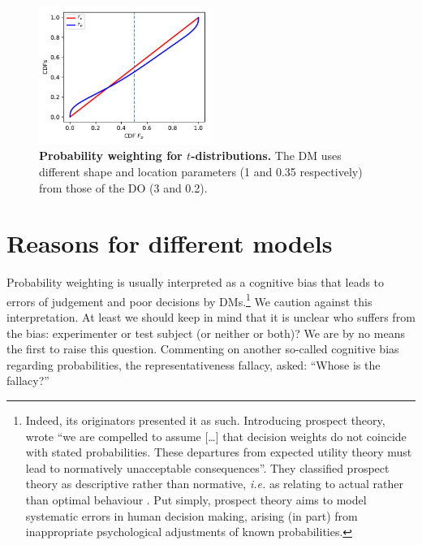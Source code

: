 \documentclass[a4paper, 12pt]{article}
\newcommand{\flabel}[1]{\label{fig:#1}}
\newcommand{\seclabel}[1]{\label{sec:#1}}
\newcommand{\ie}{\textit{i.e.}\xspace}
\newcommand{\ND}{\mathcal{N}} %
\begin{document}
\begin{figure}[htb]
\centering
\includegraphics[width=0.5\textwidth]{./figs/Student-t.pdf}
\caption{\textbf{Probability weighting for $t$-distributions.} The DM uses different shape and location parameters (1 and 0.35 respectively) from those of the DO (3 and 0.2).}
\flabel{Student-t}
\end{figure}



\FloatBarrier

\section{Reasons for different models\seclabel{Reasons_for}}
Probability weighting is usually interpreted as a cognitive bias that leads to errors of judgement and poor decisions by DMs.\footnote{Indeed, its originators presented it as such.
Introducing prospect theory, \textcite[277]{KahnemanTversky1979} wrote ``we are compelled to assume [\dots] that decision weights do not coincide with stated probabilities. These departures from expected utility theory must lead to normatively unacceptable consequences''.
They classified prospect theory as descriptive rather than normative, \ie as relating to actual rather than optimal behaviour \parencite[p. S252]{TverskyKahneman1986}.
Put simply, prospect theory aims to model systematic errors in human decision making, arising (in part) from inappropriate psychological adjustments of known probabilities.}
We caution against this interpretation.
At least we should keep in mind that it is unclear who suffers from the bias: experimenter or test subject (or neither or both)?
We are by no means the first to raise this question.
Commenting on another so-called cognitive bias regarding probabilities, the representativeness fallacy, \textcite{Cohen1979a} asked: ``Whose is the fallacy?''
\end{document}

